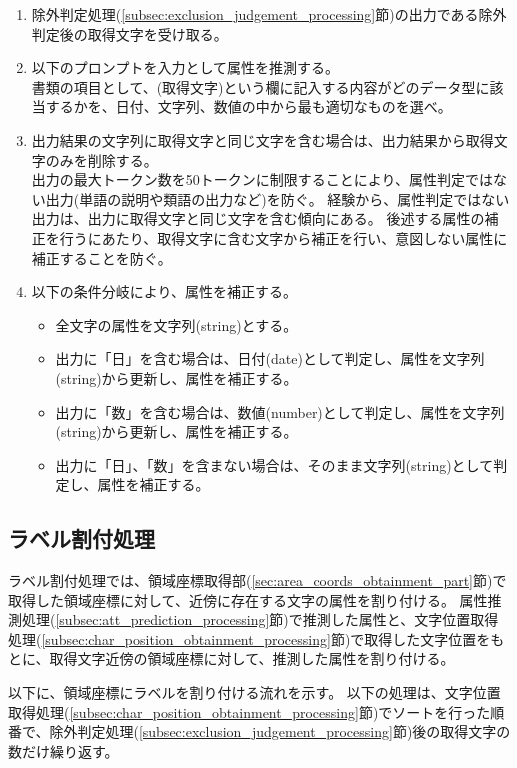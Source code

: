 \begin{enumerate}
    \item 除外判定処理(\ref{subsec:exclusion_judgement_processing}節)の出力である除外判定後の取得文字を受け取る。
    \item 以下のプロンプトを入力として属性を推測する。\\
        書類の項目として、(取得文字)という欄に記入する内容がどのデータ型に該当するかを、日付、文字列、数値の中から最も適切なものを選べ。
    \item 出力結果の文字列に取得文字と同じ文字を含む場合は、出力結果から取得文字のみを削除する。\\
        出力の最大トークン数を50トークンに制限することにより、属性判定ではない出力(単語の説明や類語の出力など)を防ぐ。
        経験から、属性判定ではない出力は、出力に取得文字と同じ文字を含む傾向にある。
        後述する属性の補正を行うにあたり、取得文字に含む文字から補正を行い、意図しない属性に補正することを防ぐ。
    \item 以下の条件分岐により、属性を補正する。
        \begin{itemize}
            \item 全文字の属性を文字列(string)とする。
            \item 出力に「日」を含む場合は、日付(date)として判定し、属性を文字列(string)から更新し、属性を補正する。
            \item 出力に「数」を含む場合は、数値(number)として判定し、属性を文字列(string)から更新し、属性を補正する。
            \item 出力に「日」、「数」を含まない場合は、そのまま文字列(string)として判定し、属性を補正する。
        \end{itemize}
\end{enumerate}

\subsection{ラベル割付処理}\label{subsec:label_link_processing}
ラベル割付処理では、領域座標取得部(\ref{sec:area_coords_obtainment_part}節)で取得した領域座標に対して、近傍に存在する文字の属性を割り付ける。
属性推測処理(\ref{subsec:att_prediction_processing}節)で推測した属性と、文字位置取得処理(\ref{subsec:char_position_obtainment_processing}節)で取得した文字位置をもとに、取得文字近傍の領域座標に対して、推測した属性を割り付ける。

以下に、領域座標にラベルを割り付ける流れを示す。
以下の処理は、文字位置取得処理(\ref{subsec:char_position_obtainment_processing}節)でソートを行った順番で、除外判定処理(\ref{subsec:exclusion_judgement_processing}節)後の取得文字の数だけ繰り返す。


